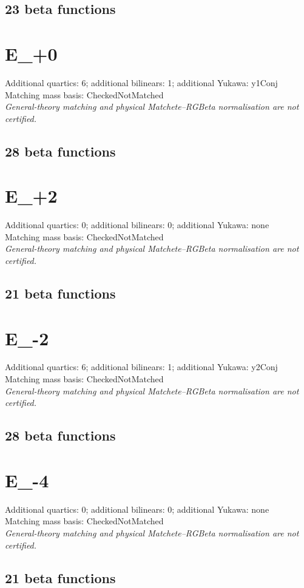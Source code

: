 \documentclass[10pt,a4paper]{article}
\begin{document}
\subsection*{23 beta functions}

\clearpage
\section{E\_+0}
Additional quartics: 6; additional bilinears: 1; additional Yukawa: y1Conj\\
Matching mass basis: CheckedNotMatched\\
\emph{General-theory matching and physical Matchete--RGBeta normalisation are not certified.}
\subsection*{28 beta functions}

\clearpage
\section{E\_+2}
Additional quartics: 0; additional bilinears: 0; additional Yukawa: none\\
Matching mass basis: CheckedNotMatched\\
\emph{General-theory matching and physical Matchete--RGBeta normalisation are not certified.}
\subsection*{21 beta functions}

\clearpage
\section{E\_-2}
Additional quartics: 6; additional bilinears: 1; additional Yukawa: y2Conj\\
Matching mass basis: CheckedNotMatched\\
\emph{General-theory matching and physical Matchete--RGBeta normalisation are not certified.}
\subsection*{28 beta functions}

\clearpage
\section{E\_-4}
Additional quartics: 0; additional bilinears: 0; additional Yukawa: none\\
Matching mass basis: CheckedNotMatched\\
\emph{General-theory matching and physical Matchete--RGBeta normalisation are not certified.}
\subsection*{21 beta functions}

\end{document}
